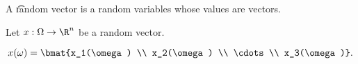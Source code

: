 


A \t{random vector} is a random variables whose values are vectors.


Let $x: \Omega \to \R^n$ be a random vector.

$$
  x(\omega) = \bmat{x_1(\omega) \\ x_2(\omega) \\ \cdots \\ x_3(\omega)}.
$$
